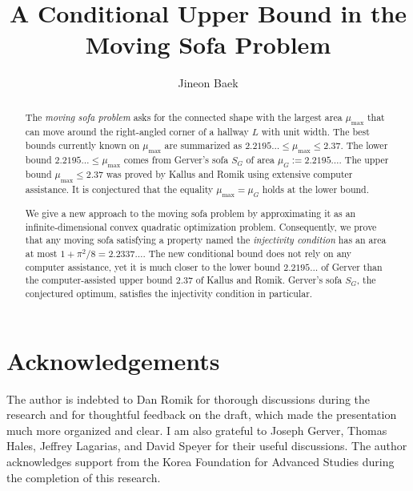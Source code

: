 \documentclass[10pt]{article}
\title{A Conditional Upper Bound in the Moving Sofa Problem}
\author{Jineon Baek}
\theoremstyle{plain}
\theoremstyle{definition}
\theoremstyle{remark}
\begin{document}
\maketitle

\begin{abstract}
The \emph{moving sofa problem} asks for the connected shape with the largest area $\mu_{\text{max}}$ that can move around the right-angled corner of a hallway $L$ with unit width. The best bounds currently known on $\mu_{\max}$ are summarized as $2.2195\ldots \leq \mu_{\max} \leq 2.37$. The lower bound $2.2195\ldots \leq \mu_{\max}$ comes from Gerver's sofa $S_G$ of area $\mu_G := 2.2195\ldots$. The upper bound $\mu_{\max} \leq 2.37$ was proved by Kallus and Romik using extensive computer assistance. It is conjectured that the equality $\mu_{\max} = \mu_G$ holds at the lower bound.

We give a new approach to the moving sofa problem by approximating it as an infinite-dimensional convex quadratic optimization problem. Consequently, we prove that any moving sofa satisfying a property named the \emph{injectivity condition} has an area at most $1 + \pi^2/8 = 2.2337\dots$. The new conditional bound does not rely on any computer assistance, yet it is much closer to the lower bound $2.2195\ldots$ of Gerver than the computer-assisted upper bound $2.37$ of Kallus and Romik. Gerver's sofa $S_G$, the conjectured optimum, satisfies the injectivity condition in particular.
\end{abstract}

\tableofcontents



\section*{Acknowledgements}

The author is indebted to Dan Romik for thorough discussions during the research and for thoughtful feedback on the draft, which made the presentation much more organized and clear. I am also grateful to Joseph Gerver, Thomas Hales, Jeffrey Lagarias, and David Speyer for their useful discussions. The author acknowledges support from the Korea Foundation for Advanced Studies during the completion of this research.

\printbibliography
\end{document}
